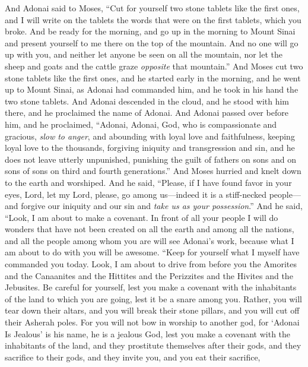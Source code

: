 \begin{biblechapter} %
 And Adonai said to Moses, “Cut for yourself two stone tablets like the first ones, and I will write on the tablets the words that were on the first tablets, which you broke.
\verse And be ready for the morning, and go up in the morning to Mount Sinai and present yourself to me there on the top of the mountain.
\verse And no one will go up with you, and neither let anyone be seen on all the mountain, nor let the sheep and goats and the cattle graze \textit{opposite} that mountain.”
\verse And Moses cut two stone tablets like the first ones, and he started early in the morning, and he went up to Mount Sinai, as Adonai had commanded him, and he took in his hand the two stone tablets.
\verse And Adonai descended in the cloud, and he stood with him there, and he proclaimed the name of Adonai.
\verse And Adonai passed over before him, and he proclaimed, “Adonai, Adonai, God, who is compassionate and gracious, \textit{slow to anger}, and abounding with loyal love and faithfulness,
\verse keeping loyal love to the thousands, forgiving iniquity and transgression and sin, and he does not leave utterly unpunished, punishing the guilt of fathers on sons and on sons of sons on third and fourth generations.”
\verse And Moses hurried and knelt down to the earth and worshiped.
\verse And he said, “Please, if I have found favor in your eyes, Lord, let my Lord, please, go among us—indeed it is a stiff-necked people—and forgive our iniquity and our sin and \textit{take us as your possession}.”
 And he said, “Look, I am about to make a covenant. In front of all your people I will do wonders that have not been created on all the earth and among all the nations, and all the people among whom you are will see Adonai’s work, because what I am about to do with you will be awesome.
\verse “Keep for yourself what I myself have commanded you today. Look, I am about to drive from before you the Amorites and the Canaanites and the Hittites and the Perizzites and the Hivites and the Jebusites.
\verse Be careful for yourself, lest you make a covenant with the inhabitants of the land to which you are going, lest it be a snare among you.
\verse Rather, you will tear down their altars, and you will break their stone pillars, and you will cut off their Asherah poles.
\verse For you will not bow in worship to another god, for ‘Adonai Is Jealous’ is his name, he is a jealous God,
\verse lest you make a covenant with the inhabitants of the land, and they prostitute themselves after their gods, and they sacrifice to their gods, and they invite you, and you eat their sacrifice,

\end{biblechapter}
